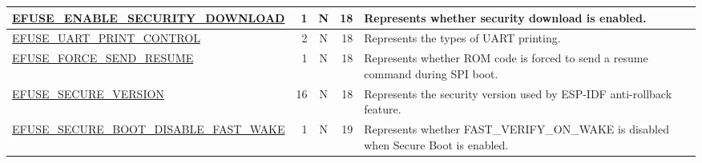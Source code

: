 \begin{longtable}[l]{ |m{8.2cm}|r|c|r|m{9cm}| }
    \hline
    \hyperref[fielddesc:EFUSEENABLESECURITYDOWNLOAD]{EFUSE\_ENABLE\_SECURITY\_DOWNLOAD} & 1 & N & 18 & Represents whether security download is enabled.\\
    \hline
    \hyperref[fielddesc:EFUSEUARTPRINTCONTROL]{EFUSE\_UART\_PRINT\_CONTROL} & 2 & N & 18 & Represents the types of UART printing.\\
    \hline
    \hyperref[fielddesc:EFUSEFORCESENDRESUME]{EFUSE\_FORCE\_SEND\_RESUME} & 1 & N & 18 & Represents whether ROM code is forced to send a resume command during SPI boot.\\
    \hline
    \hyperref[fielddesc:EFUSESECUREVERSION]{EFUSE\_SECURE\_VERSION} & 16 & N & 18 & Represents the security version used by ESP-IDF anti-rollback feature.\\\hline
    \hyperref[fielddesc:EFUSESECUREBOOTDISABLEFASTWAKE]{EFUSE\_SECURE\_BOOT\_DISABLE\_FAST\_WAKE} & 1 & N & 19 & Represents whether FAST\_VERIFY\_ON\_WAKE is disabled when Secure Boot is enabled.\\\hline
\end{longtable}
